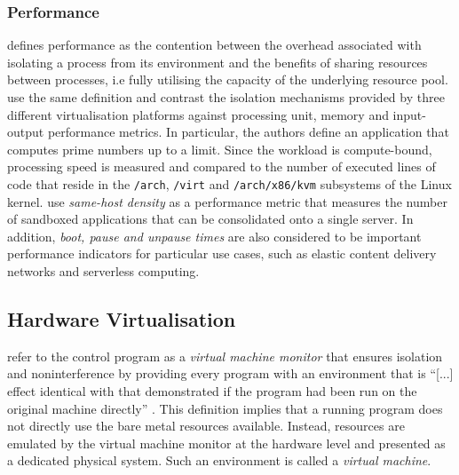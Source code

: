 \subsubsection{Performance}
\label{ch:fundamentals/virtualisation/axioms/performance}
\textcite{10.1145/3365199} defines performance as the contention between the overhead associated 
with isolating a process from its environment and the benefits of sharing resources between processes,
i.e fully utilising the capacity of the underlying resource pool. 
\textcite{10.1145/3381052.3381315} use the same definition and contrast the isolation mechanisms provided
by three different virtualisation platforms against processing unit, memory and input-output performance metrics. 
In particular, the authors define an application that computes prime numbers up to a limit. 
Since the workload is compute-bound, processing speed is measured and compared to the
number of executed lines of code that reside in the \verb|/arch|, \verb|/virt| and \verb|/arch/x86/kvm|
subsystems of the Linux kernel. \textcite{10.1145/3132747.3132763} use \textit{same-host density} as a 
performance metric that measures the number of sandboxed applications that can be consolidated onto a single server. 
In addition, \textit{boot, pause and unpause times} are also considered to be important performance indicators for particular 
use cases, such as elastic content delivery networks \cite{10.1145/3050748.3050757} \cite{10.1145/3132747.3132763}
and serverless computing.

\subsection{Hardware Virtualisation}
\label{ch:fundamentals/virtualisation/hardware-virtualisation}
\textcite{10.1145/361011.361073} refer to the control program as a \textit{virtual machine monitor} that 
ensures isolation and noninterference by providing every program with an environment that is \enquote{[...] effect
identical with that demonstrated if the program had been run on the original machine directly} 
\cite[2]{10.1145/361011.361073}. This definition implies that a running program does not directly use
the bare metal resources available. Instead, resources are emulated by the virtual machine monitor at
the hardware level and presented as a dedicated physical system. Such an environment is called 
a \textit{virtual machine}.

